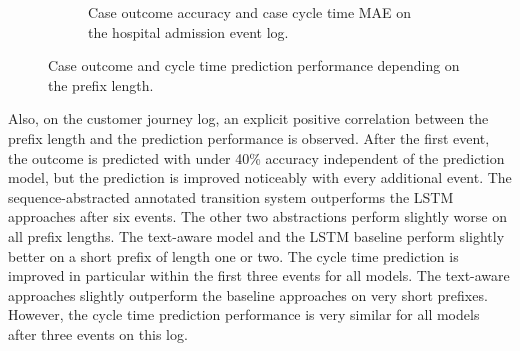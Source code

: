 \begin{figure}[!htbp]
\begin{subfigure}{\textwidth}
		\caption{Case outcome accuracy and case cycle time MAE on the hospital admission event log.}
	\end{subfigure}
	\caption[Case outcome and cycle time prediction performance depending on the prefix length]{Case outcome and cycle time prediction performance depending on the prefix length.}
	\label{fig:outcome-cycle-time-prefix}
\end{figure}


Also, on the customer journey log, an explicit positive correlation between the prefix length and the prediction performance is observed.
After the first event, the outcome is predicted with under 40\% accuracy independent of the prediction model, but the prediction is improved noticeably with every additional event.
The sequence-abstracted annotated transition system outperforms the LSTM approaches after six events.
The other two abstractions perform slightly worse on all prefix lengths.
The text-aware model and the LSTM baseline perform slightly better on a short prefix of length one or two.
The cycle time prediction is improved in particular within the first three events for all models.
The text-aware approaches slightly outperform the baseline approaches on very short prefixes.
However, the cycle time prediction performance is very similar for all models after three events on this log.

